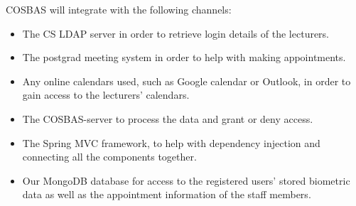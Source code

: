 COSBAS will integrate with the following channels:

\begin{itemize}
	\item The CS LDAP server in order to retrieve login details of the lecturers.
	\item The postgrad meeting system in order to help with making appointments.
	\item Any online calendars used, such as Google calendar or Outlook, in order to gain access to the lecturers' calendars.
	\item The COSBAS-server to process the data and grant or deny access.
	\item The Spring MVC framework, to help with dependency injection and connecting all the components together.
	\item Our MongoDB database for access to the registered users'  stored biometric data as well as the appointment information of the staff members. 
\end{itemize}